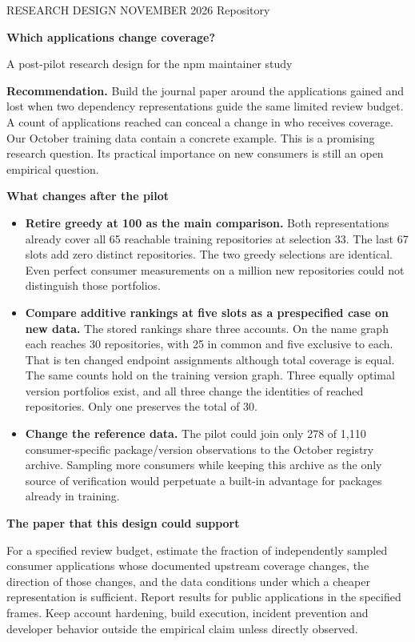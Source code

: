 \documentclass[11pt,a4paper]{article}
\newcommand{\hd}[1]{\par\textbf{\color{accent}#1}\par\nopagebreak}
\newcommand{\code}[1]{\texttt{\detokenize{#1}}}
\begin{document}
{\small\color{muted}RESEARCH DESIGN  NOVEMBER 2026 \quad Repository \code{472ab95f4be8}}\par
{\Huge\bfseries\color{ink}Which applications change coverage?\par}
{\large A post-pilot research design for the npm maintainer study}\par
\textbf{Recommendation.} Build the journal paper around the applications gained and lost when two dependency representations guide the same limited review budget. A count of applications reached can conceal a change in who receives coverage. Our October training data contain a concrete example. This is a promising research question. Its practical importance on new consumers is still an open empirical question.

\hd{What changes after the pilot}
\begin{itemize}
\item \textbf{Retire greedy at 100 as the main comparison.} Both representations already cover all 65 reachable training repositories at selection 33. The last 67 slots add zero distinct repositories. The two greedy selections are identical. Even perfect consumer measurements on a million new repositories could not distinguish those portfolios.
\item \textbf{Compare additive rankings at five slots as a prespecified case on new data.} The stored rankings share three accounts. On the name graph each reaches 30 repositories, with 25 in common and five exclusive to each. That is ten changed endpoint assignments although total coverage is equal. The same counts hold on the training version graph. Three equally optimal version portfolios exist, and all three change the identities of reached repositories. Only one preserves the total of 30.
\item \textbf{Change the reference data.} The pilot could join only 278 of 1,110 consumer-specific package/version observations to the October registry archive. Sampling more consumers while keeping this archive as the only source of verification would perpetuate a built-in advantage for packages already in training.
\end{itemize}
\hd{The paper that this design could support}
For a specified review budget, estimate the fraction of independently sampled consumer applications whose documented upstream coverage changes, the direction of those changes, and the data conditions under which a cheaper representation is sufficient. Report results for public applications in the specified frames. Keep account hardening, build execution, incident prevention and developer behavior outside the empirical claim unless directly observed.
\end{document}
